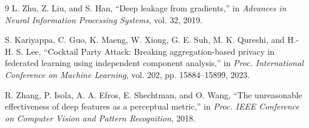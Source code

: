 \documentclass{article}
\begin{document}
\begin{thebibliography}{9}
L. Zhu, Z. Liu, and S. Han,
``Deep leakage from gradients,''
in \emph{Advances in Neural Information Processing Systems}, vol. 32, 2019.

S. Kariyappa, C. Guo, K. Maeng, W. Xiong, G. E. Suh,
M. K. Qureshi, and H.-H. S. Lee,
``Cocktail Party Attack: Breaking aggregation-based privacy in federated
learning using independent component analysis,''
in \emph{Proc. International Conference on Machine Learning},
vol. 202, pp. 15884--15899, 2023.

R. Zhang, P. Isola, A. A. Efros, E. Shechtman, and O. Wang,
``The unreasonable effectiveness of deep features as a perceptual metric,''
in \emph{Proc. IEEE Conference on Computer Vision and Pattern Recognition},
2018.
\end{thebibliography}
\end{document}
